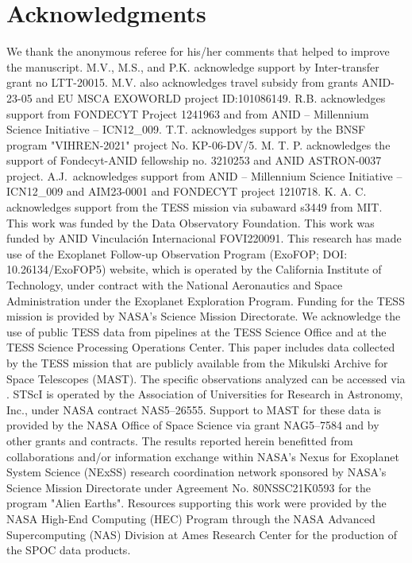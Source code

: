 \documentclass[twocolumn,twocolappendix]{aastex631}
\begin{document}
\section{Acknowledgments}
We thank the anonymous referee for his/her comments that helped to improve the manuscript. M.V., M.S., and P.K. acknowledge support by Inter-transfer grant no LTT-20015. M.V. also acknowledges travel subsidy from grants ANID-23-05 and EU MSCA EXOWORLD project ID:101086149.
R.B. acknowledges support from FONDECYT Project 1241963 and from ANID -- Millennium  Science  Initiative -- ICN12\_009.
T.T. acknowledges support by the BNSF program "VIHREN-2021" project No. KP-06-DV/5.
M. T. P. acknowledges the support of Fondecyt-ANID fellowship no. 3210253 and ANID ASTRON-0037 project.
A.J.\ acknowledges support from ANID -- Millennium  Science  Initiative -- ICN12\_009 and AIM23-0001 and FONDECYT project 1210718.
K. A. C. acknowledges support from the TESS mission via subaward s3449 from MIT.
This work was funded by the Data Observatory Foundation.
This work was funded by ANID Vinculación Internacional FOVI220091.
This research has made use of the Exoplanet Follow-up Observation Program (ExoFOP; DOI: 10.26134/ExoFOP5) website, which is operated by the California Institute of Technology, under contract with the National Aeronautics and Space Administration under the Exoplanet Exploration Program.
Funding for the TESS mission is provided by NASA's Science Mission Directorate. We acknowledge the use of public TESS data from pipelines at the TESS Science Office and at the TESS Science Processing Operations Center. This paper includes data collected by the TESS mission that are publicly available from the Mikulski Archive for Space Telescopes (MAST). The specific observations analyzed can be accessed via . STScI is operated by the Association of Universities for Research in Astronomy, Inc., under NASA contract NAS5–26555. Support to MAST for these data is provided by the NASA Office of Space Science via grant NAG5–7584 and by other grants and contracts.
The results reported herein benefitted from collaborations and/or information exchange within NASA's Nexus for Exoplanet System Science (NExSS) research coordination network sponsored by NASA's Science Mission Directorate under Agreement No. 80NSSC21K0593 for the program "Alien Earths".
Resources supporting this work were provided by the NASA High-End Computing (HEC) Program through the NASA Advanced Supercomputing (NAS) Division at Ames Research Center for the production of the SPOC data products.
\end{document}
